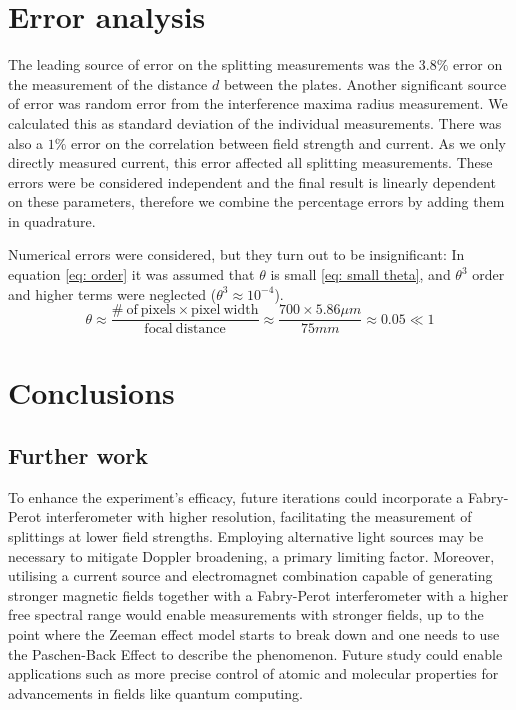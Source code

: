 \documentclass[11pt]{article}
\begin{document}
\section{Error analysis} \label{sec: err}
The leading source of error on the splitting measurements was the $3.8\%$ error on the measurement of the distance $d$ between the plates. Another significant source of error was random error from the interference maxima radius measurement. We calculated this as standard deviation of the individual measurements. There was also a $1\%$ error on the correlation between field strength and current. As we only directly measured current, this error affected all splitting measurements. These errors were be considered independent and the final result is linearly dependent on these parameters, therefore we combine the percentage errors by adding them in quadrature.

Numerical errors were considered, but they turn out to be insignificant: In equation \eqref{eq: order} it was assumed that $\theta$ is small \eqref{eq: small theta}, and $\theta^3$ order and higher terms were neglected ($\theta^3 \approx 10^{-4}$). 
\begin{equation}
    \theta \approx \frac{\mathrm{\#\ of\ pixels} \times \mathrm{pixel\ width}}{\mathrm{focal\ distance}} \approx \frac{700 \times 5.86 \si{\mu m}}{75 \si{mm}}
    \approx 0.05 \ll 1
    \label{eq: small theta}
\end{equation}

\section{Conclusions} \label{sec: conclusion}
\subsection{Further work}
To enhance the experiment's efficacy, future iterations could incorporate a Fabry-Perot interferometer with higher resolution, facilitating the measurement of splittings at lower field strengths. Employing alternative light sources may be necessary to mitigate Doppler broadening, a primary limiting factor. Moreover, utilising a current source and electromagnet combination capable of generating stronger magnetic fields together with a Fabry-Perot interferometer with a higher free spectral range would enable measurements with stronger fields, up to the point where the Zeeman effect model starts to break down and one needs to use the Paschen-Back Effect to describe the phenomenon. Future study could enable applications such as more precise control of atomic and molecular properties for advancements in fields like quantum computing.
\end{document}
